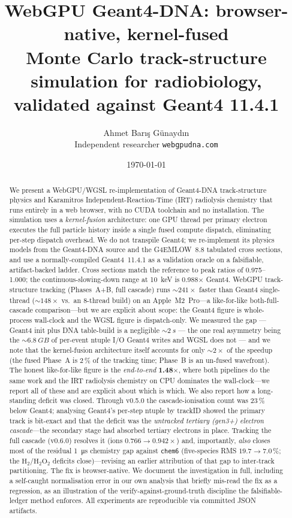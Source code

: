 \documentclass[11pt]{article}
\title{\textbf{WebGPU Geant4-DNA:} browser-native, kernel-fused\\
Monte Carlo track-structure simulation for radiobiology,\\
validated against Geant4 11.4.1}
\author{Ahmet Bar\i{}\c{s} G\"unayd\i{}n\\
\small Independent researcher \quad\textbar\quad \texttt{webgpudna.com}}
\date{\today}
\begin{document}
\maketitle

\begin{abstract}
We present a WebGPU/WGSL re-implementation of Geant4-DNA track-structure
physics and Karamitros Independent-Reaction-Time (IRT) radiolysis chemistry
that runs entirely in a web browser, with no CUDA toolchain and no
installation. The simulation uses a \emph{kernel-fusion} architecture: one
GPU thread per primary electron executes the full particle history inside a
single fused compute dispatch, eliminating per-step dispatch overhead. We do
not transpile Geant4; we re-implement its physics models from the Geant4-DNA
source and the G4EMLOW~8.8 tabulated cross sections, and use a
normally-compiled Geant4~11.4.1 as a validation oracle on a falsifiable,
artifact-backed ladder. Cross sections match the reference to peak ratios of
\numrange{0.975}{1.000}; the continuous-slowing-down range at \SI{10}{keV} is
\num{0.988}$\times$ Geant4. WebGPU track-structure tracking (Phases~A+B, full cascade) runs
\textbf{${\sim}241\times$} faster than Geant4 single-thread (${\sim}148\times$
vs.\ an 8-thread build) on an Apple~M2~Pro---a like-for-like both-full-cascade
comparison---but we are explicit about scope:
the Geant4 figure is whole-process wall-clock and the WGSL figure is
dispatch-only. We measured the gap --- Geant4 init plus DNA table-build is a
negligible ${\sim}\SI{2}{s}$ ---
the one real asymmetry being the ${\sim}\SI{6.8}{GB}$ of per-event ntuple I/O
Geant4 writes and WGSL does not --- and we note that the kernel-fusion
architecture itself accounts for only ${\sim}2\times$ of the speedup (the fused
Phase~A is 2\,\% of the tracking time; Phase~B is an un-fused wavefront). The honest like-for-like
figure is the \emph{end-to-end} \textbf{1.48$\times$}, where both pipelines do
the same work and the IRT radiolysis chemistry on CPU dominates the
wall-clock---we report all of these and are explicit about which is which.
We also report how a long-standing deficit was closed. Through v0.5.0 the
cascade-ionisation count was 23\,\% below Geant4; analysing Geant4's per-step
ntuple by trackID showed the primary track is bit-exact and that the deficit was
the \emph{untracked tertiary (gen3+) electron cascade}---the secondary stage had
absorbed tertiary electrons in place. Tracking the full cascade (v0.6.0) resolves
it (ions $0.766\to0.942\times$) and, importantly, \emph{also} closes most of the
residual \SI{1}{\micro s} chemistry gap against \texttt{chem6} (five-species RMS
$19.7\to7.0\,\%$; the $\mathrm{H_2}$/$\mathrm{H_2O_2}$ deficits close)---revising
an earlier attribution of that gap to inter-track partitioning. The fix is
browser-native. We document the investigation in full, including a self-caught
normalisation error in our own analysis that briefly mis-read the fix as a
regression, as an illustration of the verify-against-ground-truth discipline the
falsifiable-ledger method enforces. All experiments are reproducible via
committed JSON artifacts.
\end{abstract}
\end{document}

